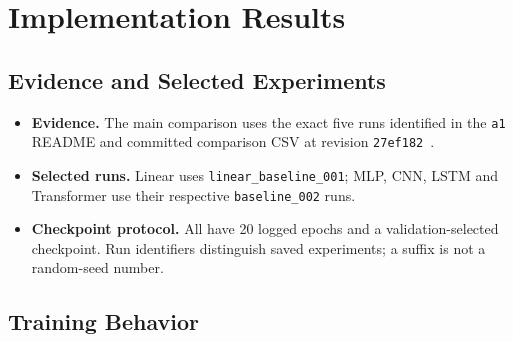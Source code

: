 \section{Implementation Results}
\label{sec:results}
\subsection{Evidence and Selected Experiments}
\begin{itemize}
\setlength{\itemsep}{3pt}
\setlength{\parskip}{0pt}
\item \textbf{Evidence.} The main comparison uses the exact five runs identified in the \texttt{a1} README and committed comparison CSV at revision \texttt{27ef182}~\cite{code}.
\item \textbf{Selected runs.} Linear uses \texttt{linear\_baseline\_001}; MLP, CNN, LSTM and Transformer use their respective \texttt{baseline\_002} runs.
\item \textbf{Checkpoint protocol.} All have 20 logged epochs and a validation-selected checkpoint. Run identifiers distinguish saved experiments; a suffix is not a random-seed number.
\end{itemize}

\subsection{Training Behavior}

